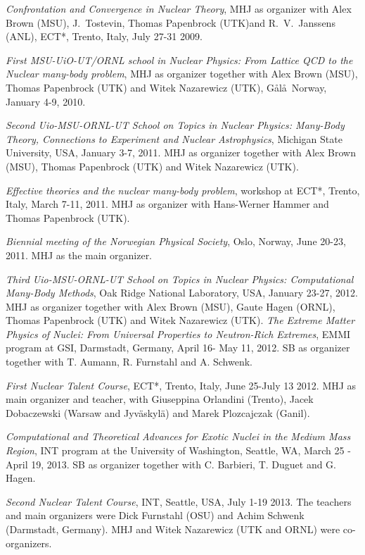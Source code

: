\begin{thebibliography}{200}
 {\em Confrontation and Convergence in Nuclear Theory}, MHJ as organizer with Alex Brown (MSU), J.~Tostevin, Thomas Papenbrock (UTK)and R.~V.~Janssens (ANL), ECT*, Trento, Italy, July 27-31 2009.

 {\em First MSU-UiO-UT/ORNL school in Nuclear Physics: From Lattice QCD to the Nuclear many-body problem}, MHJ as organizer together with Alex Brown (MSU), Thomas Papenbrock (UTK) and
Witek Nazarewicz (UTK), G\aa l\aa\, Norway, January 4-9, 2010.

 {\em Second Uio-MSU-ORNL-UT School on Topics in Nuclear Physics: Many-Body Theory, Connections to
Experiment and Nuclear Astrophysics}, Michigan State University, USA,
January 3-7, 2011. MHJ as organizer together with Alex Brown (MSU),
Thomas Papenbrock (UTK) and Witek Nazarewicz (UTK).

 {\em Effective theories and the nuclear many-body problem}, workshop at ECT*, Trento, Italy, March 7-11, 2011. MHJ as organizer with Hans-Werner Hammer and Thomas Papenbrock (UTK). 

 {\em Biennial meeting of the Norwegian Physical Society}, Oslo, Norway, June 20-23, 2011. MHJ as the main organizer.

 {\em Third Uio-MSU-ORNL-UT School on Topics in Nuclear Physics: Computational Many-Body Methods}, Oak Ridge National Laboratory, USA, 
January 23-27, 2012. MHJ as organizer together with Alex Brown (MSU),
Gaute Hagen (ORNL), Thomas Papenbrock (UTK) and Witek Nazarewicz
(UTK).
 {\em The Extreme Matter Physics of Nuclei: From Universal Properties to Neutron-Rich Extremes}, EMMI program at GSI, Darmstadt, Germany, April 16- May 11, 2012. SB as organizer together with T. Aumann, R. Furnstahl and A. Schwenk.


 {\em First Nuclear Talent Course}, ECT*, Trento, Italy, June 25-July 13 2012. MHJ as main organizer and teacher, with Giuseppina Orlandini (Trento), Jacek Dobaczewski (Warsaw and Jyv\"askyl\"a) and Marek Plozcajczak (Ganil). 

 {\em Computational and Theoretical Advances for Exotic Nuclei in the Medium Mass Region}, INT program at the University of Washington, Seattle, WA, March 25 - April 19, 2013. SB as organizer together with C. Barbieri, T. Duguet and G. Hagen.

 {\em Second Nuclear Talent Course}, INT, Seattle, USA, July 1-19 2013. The teachers and main organizers were Dick Furnstahl (OSU) and Achim Schwenk (Darmstadt, Germany).  MHJ and Witek Nazarewicz (UTK and ORNL) were co-organizers. 



\end{thebibliography}
